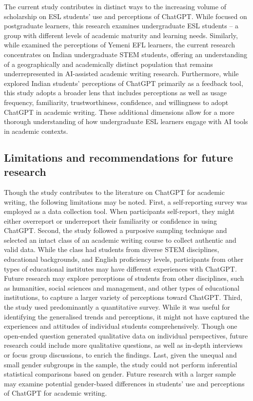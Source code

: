 \documentclass[english]{textolivre}
\begin{document}
The current study contributes in distinct ways to the increasing volume of scholarship on ESL students’ use and perceptions of ChatGPT. While \textcite{abusaaleek2024} focused on postgraduate learners, this research examines undergraduate ESL students -- a group with different levels of academic maturity and learning needs. Similarly, while \textcite{alkamel2024} examined the perceptions of Yemeni EFL learners, the current research concentrates on Indian undergraduate STEM students, offering an understanding of a geographically and academically distinct population that remains underrepresented in AI-assisted academic writing research. Furthermore, while \textcite{mahapatra2024} explored Indian students' perceptions of ChatGPT primarily as a feedback tool, this study adopts a broader lens that includes perceptions as well as usage frequency, familiarity, trustworthiness, confidence, and willingness to adopt ChatGPT in academic writing. These additional dimensions allow for a more thorough understanding of how undergraduate ESL learners engage with AI tools in academic contexts.

\subsection{Limitations and recommendations for future research}
Though the study contributes to the literature on ChatGPT for academic writing, the following limitations may be noted. First, a self-reporting survey was employed as a data collection tool. When participants self-report, they might either overreport or underreport their familiarity or confidence in using ChatGPT. Second, the study followed a purposive sampling technique and selected an intact class of an academic writing course to collect authentic and valid data. While the class had students from diverse STEM disciplines, educational backgrounds, and English proficiency levels, participants from other types of educational institutes may have different experiences with ChatGPT. Future research may explore perceptions of students from other disciplines, such as humanities, social sciences and management, and other types of educational institutions, to capture a larger variety of perceptions toward ChatGPT. Third, the study used predominantly a quantitative survey. While it was useful for identifying the generalised trends and perceptions, it might not have captured the experiences and attitudes of individual students comprehensively. Though one open-ended question generated qualitative data on individual perspectives, future research could include more qualitative questions, as well as in-depth interviews or focus group discussions, to enrich the findings. Last, given the unequal and small gender subgroups in the sample, the study could not perform inferential statistical comparisons based on gender. Future research with a larger sample may examine potential gender-based differences in students’ use and perceptions of ChatGPT for academic writing.
\end{document}
